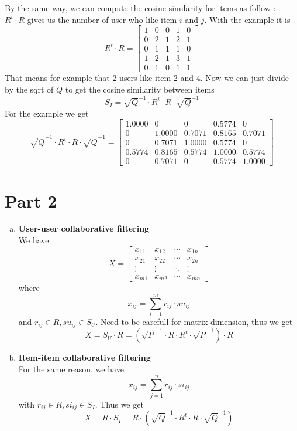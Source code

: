 \documentclass[11pt,a4paper,notitlepage]{article}
\begin{document}
By the same way, we can compute the cosine similarity for items as follow :\\
$R^t\cdot R$ gives us the number of user who like item $i$ and $j$. With the example it is $$R^t\cdot R =\left[ \begin{matrix}
     1  &   0   &  0&     1    & 0\\
     0  &  2    & 1  &   2    & 1\\
     0  &   1   &  1  &   1  &   0\\
     1  &  2   &  1    & 3  &   1\\
     0  &   1 &    0    & 1&     1
\end{matrix}\right]$$
That means for example that 2 users like item 2 and 4.
Now we can just divide by the sqrt of $Q$ to get the cosine similarity between items $$S_I = \sqrt{Q}^{-1} \cdot R^t \cdot R \cdot \sqrt{Q}^{-1}$$
For the example we get $$\sqrt{Q}^{-1} \cdot R^t\cdot R \cdot \sqrt{Q}^{-1} = \left[\begin{matrix}

    1.0000  &       0    &     0&    0.5774    &     0\\
         0   & 1.0000   & 0.7071 &   0.8165   & 0.7071\\
         0    &0.7071  &  1.0000  &  0.5774  &       0\\
    0.5774    &0.8165 &   0.5774   & 1.0000 &   0.5774\\
         0    &0.7071&         0    &0.5774&    1.0000
\end{matrix}\right]$$
\section*{Part 2}
\begin{enumerate}[(a)]
\item  \textbf{User-user collaborative filtering}\\

We have $$X = \left[\begin{matrix}
x_{11} & x_{12} & \cdots & x_{1n}\\
x_{21} & x_{22} & \cdots & x_{2n}\\
\vdots & \vdots & \ddots & \vdots\\
x_{m1} & x_{m2} & \cdots & x_{mn}
\end{matrix}\right]$$ where $$x_{ij} = \sum_{i=1}^{m} r_{ij} \cdot su_{ij}$$ and $r_{ij} \in R, su_{ij} \in S_U$. Need to be carefull for matrix dimension, thus we get $$X = S_U \cdot R = (\sqrt{P}^{-1} \cdot R \cdot R^t \cdot \sqrt{P}^{-1}) \cdot R$$

\item \textbf{Item-item collaborative filtering}\\
For the same reason, we have $$x_{ij} = \sum_{j=1}^{n} r_{ij} \cdot si_{ij}$$ with $r_{ij} \in R, si_{ij} \in S_I$. Thus we get $$X = R \cdot S_I = R \cdot (\sqrt{Q}^{-1} \cdot R^t \cdot R \cdot \sqrt{Q}^{-1})$$
\end{enumerate}
\end{document}
